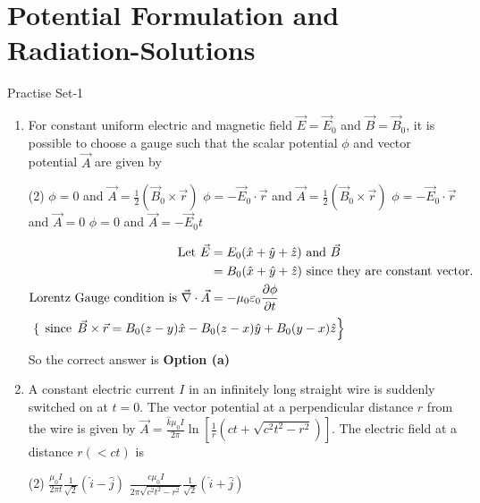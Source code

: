\chapter{Potential Formulation and Radiation-Solutions}
\begin{abox}
	Practise Set-1
\end{abox}
\begin{enumerate}
	\item   For constant uniform electric and magnetic field $\vec{E}=\vec{E}_{0}$ and $\vec{B}=\vec{B}_{0}$, it is possible to choose a gauge such that the scalar potential $\phi$ and vector potential $\vec{A}$ are given by
	{}
	\begin{tasks}(2)
		\task[\textbf{a.}] $\phi=0$ and $\vec{A}=\frac{1}{2}\left(\vec{B}_{0} \times \vec{r}\right)$
		\task[\textbf{b.}] $\phi=-\vec{E}_{0} \cdot \vec{r}$ and $\vec{A}=\frac{1}{2}\left(\vec{B}_{0} \times \vec{r}\right)$
		\task[\textbf{c.}]  $\phi=-\vec{E}_{0} \cdot \vec{r}$ and $\vec{A}=0$
		\task[\textbf{d.}] $\phi=0$ and $\vec{A}=-\vec{E}_{0} t$
	\end{tasks}
	\begin{answer}
		\begin{align*}
		\text{Let }\vec{E}&=E_{0}(\hat{x}+\hat{y}+\hat{z})\text{ and } \vec{B}\\&=B_{0}(\hat{x}+\hat{y}+\hat{z})\text{ since they are constant vector.}\\
		\text{Lorentz Gauge condition is }\vec{\nabla} \cdot \vec{A}&=-\mu_{0} \varepsilon_{0} \frac{\partial \phi}{\partial t}\\
		\intertext{	$\left\{\right.$ since $\left.\vec{B} \times \vec{r}=B_{0}(z-y) \hat{x}-B_{0}(z-x) \hat{y}+B_{0}(y-x) \hat{z}\right\}$}
		\end{align*}
		So the correct answer is \textbf{Option (a)}
	\end{answer}
	\item	 A constant electric current $I$ in an infinitely long straight wire is suddenly switched on at $t=0$. The vector potential at a perpendicular distance $r$ from the wire is given by $\vec{A}=\frac{\hat{k} \mu_{0} I}{2 \pi} \ln \left[\frac{1}{r}\left(c t+\sqrt{c^{2} t^{2}-r^{2}}\right)\right]$. The electric field at a distance $r(<c t)$ is
	{}
	\begin{tasks}(2)
		\task[\textbf{b.}] $\frac{\mu_{0} I}{2 \pi t} \frac{1}{\sqrt{2}}(\hat{i}-\hat{j})$
		\task[\textbf{c.}] $\frac{c \mu_{0} I}{2 \pi \sqrt{c^{2} t^{2}-r^{2}}} \frac{1}{\sqrt{2}}(\hat{i}+\hat{j})$

\end{tasks}
\end{enumerate}
